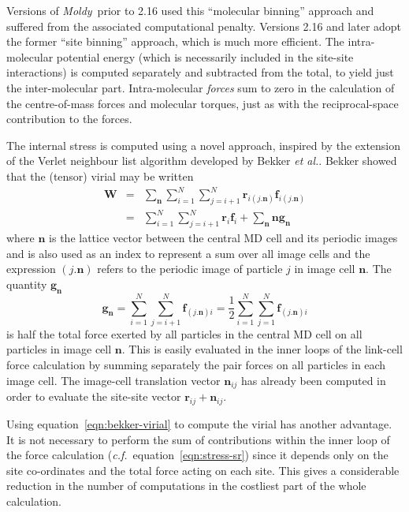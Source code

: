 \documentclass[a4paper,twoside]{report}
\providecommand{\bm}[1]{\mathbf{#1}}
\newcommand{\moldy}{\emph{Moldy}}
\newcommand{\cf}{\emph{c.f.}}
\begin{document}
Versions of \moldy\ prior to 2.16 used this ``molecular
binning'' approach and suffered from the associated computational
penalty. Versions 2.16 and later adopt the former ``site binning''
approach, which is much more efficient.  The intra-molecular potential
energy (which is necessarily included in the site-site interactions)
is computed separately and subtracted from the total, to yield just
the inter-molecular part.  Intra-molecular \emph{forces} sum to zero
in the calculation of the centre-of-mass forces and molecular torques,
just as with the reciprocal-space contribution to the forces.  

The internal stress is computed using a novel approach, inspired by
the extension of the Verlet neighbour list algorithm developed by
Bekker \emph{et al.}\cite{bekker:95}.  Bekker showed that the (tensor)
virial may be written
\begin{eqnarray}
  \label{eqn:bekker-virial}
  \bm{W} &=& \sum_{\bm{n}}\sum_{i=1}^{N} \sum_{j=i+1}^{N}
  \bm{r}_{i(j.\bm{n})}\bm{f}_{i(j.\bm{n})} \nonumber\\
         &=& \sum_{i=1}^{N} \sum_{j=i+1}^{N}
  \bm{r}_{i}\bm{f}_{i} + \sum_{\bm{n}} \bm{n}\bm{g}_{\bm{n}}
\end{eqnarray}
where $\bm{n}$ is the lattice vector between the central MD cell and
its periodic images and is also used as an index to represent a sum
over all image cells and the expression $(j.\bm{n})$ refers to
the periodic image of particle $j$ in image cell $\bm{n}$.  The
quantity $\bm{g}_{\bm{n}}$
\begin{equation}
  \label{eqn:bekker-g}
  \bm{g}_{\bm{n}} = \sum_{i=1}^{N} \sum_{j=i+1}^{N}\bm{f}_{(j.\bm{n})i} = 
  \frac{1}{2} \sum_{i=1}^{N} \sum_{j=1}^{N}\bm{f}_{(j.\bm{n})i}
\end{equation}
is half the total force exerted by all particles in the central MD
cell on all particles in image cell $\bm{n}$.  This is easily
evaluated in the inner loops of the link-cell force calculation by
summing separately the pair forces on all particles in each image cell. The
image-cell translation vector $\bm{n}_{ij}$ has already been computed in
order to evaluate the site-site vector $\bm{r}_{ij} +\bm{n}_{ij}$.

Using equation~\ref{eqn:bekker-virial} to compute the virial has
another advantage. It is not necessary to perform the sum of
contributions within the inner loop of the force calculation (\cf\
equation~\ref{eqn:stress-sr}) since it depends only on the site
co-ordinates and the total force acting on each site.  This gives a
considerable reduction in the number of computations in the costliest
part of the whole calculation.
\end{document}
